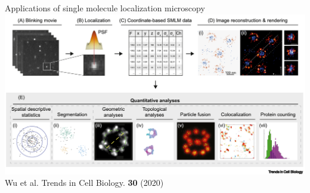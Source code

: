 \documentclass{beamer}					%
\begin{document}
\begin{frame}{Applications of single molecule localization microscopy}
\includegraphics[width=\textwidth]{media/Apps.png}
Wu et al. Trends in Cell Biology. \textbf{30} (2020)
\end{frame}

\end{document}
